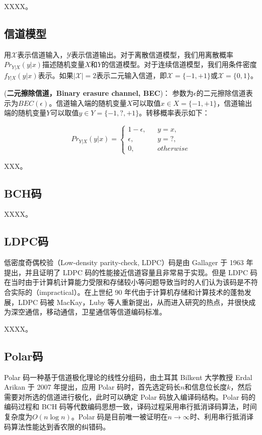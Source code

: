 XXXX。

\subsection{信道模型}
用$\mathcal{X}$表示信道输入，$\mathcal{Y}$表示信道输出。对于离散信道模型\cite{lin2001error}，我们用离散概率$Pr_{Y|X}(y|x)$描述随机变量$X$和$Y$的信道模型。对于连续信道模型，我们用条件密度$f_{Y|X}(y|x)$表示。如果$|\mathcal{X}|=2$表示二元输入信道，即$\mathcal{X}=\{-1,+1\}$或$\mathcal{X}=\{0,1\}$。

\begin{definition}{(\textbf{二元擦除信道，Binary erasure channel, BEC})：}
	参数为$\epsilon$的二元擦除信道表示为$BEC(\epsilon)$。信道输入端的随机变量$X$可以取值$x\in X=\{-1,+1\}$，信道输出端的随机变量$Y$可以取值$y\in Y=\{-1,?,+1\}$。转移概率表示如下：
	
	\begin{equation}
		Pr_{Y|X}(y|x)=\left\{
		\begin{array}{rcl}
			1-\epsilon,       &      & {y=x,}\\
			\epsilon,     &      & {y=?,}\\
			0,     &      & {otherwise}
		\end{array} \right.
	\end{equation}
	
\end{definition}


XXX。

\subsection{BCH码}
XXXX。

\subsection{LDPC码}
低密度奇偶校验（Low-density parity-check, LDPC）码是由 Gallager 于 1963 年提出\cite{gallager1962low}，并且证明了 LDPC 码的性能接近信道容量且非常易于实现。但是 LDPC 码在当时由于计算机计算能力受限和存储较小等问题导致当时的人们认为该码是不符合实际的（impractical）。在上世纪 90 年代由于计算机存储和计算技术的蓬勃发展，LDPC 码被 MacKay，Luby 等人重新提出，从而进入研究的热点，并很快成为深空通信，移动通信，卫星通信等信道编码标准\cite{ryan2009channel}。

XXXX。


\subsection{Polar码}
Polar 码一种基于信道极化理论的线性分组码，由土耳其 Bilkent 大学教授 Erdal Arikan 于 2007 年提出\cite{arikan2011systematic}，应用 Polar 码时，首先选定码长$n$和信息位长度$k$，然后需要对所选的信道进行极化，此时可以确定 Polar 码放入编译码结构。Polar 码的编码过程和 BCH 码等代数编码思想一致，译码过程采用串行抵消译码算法，时间复杂度为$O(n\log n)$。Polar 码是目前唯一被证明在$n\rightarrow \infty$时、利用串行抵消译码算法性能达到香农限的纠错码。


